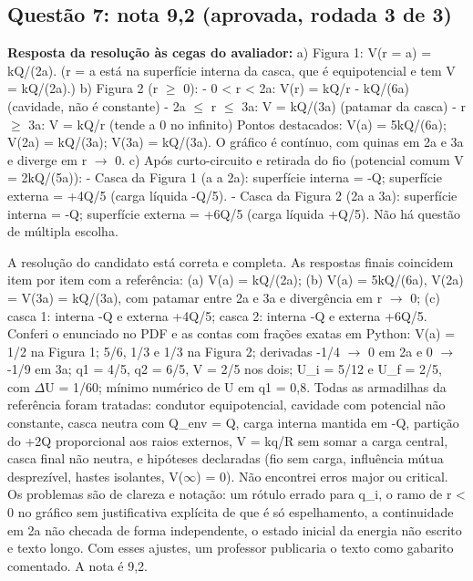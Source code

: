 \documentclass{article}%
\begin{document}
\subsection*{Questão 7: nota 9,2 (aprovada, rodada 3 de 3)}%
\textbf{Resposta da resolução às cegas do avaliador:} a) Figura 1: V(r = a) = kQ/(2a). (r = a está na superfície interna da casca, que é equipotencial e tem V = kQ/(2a).)\newline%
\newline%
b) Figura 2 (r $\geq$ 0):\newline%
{-} 0 < r < 2a: V(r) = kQ/r - kQ/(6a) (cavidade, não é constante)\newline%
{-} 2a $\leq$ r $\leq$ 3a: V = kQ/(3a) (patamar da casca)\newline%
{-} r $\geq$ 3a: V = kQ/r (tende a 0 no infinito)\newline%
Pontos destacados: V(a) = 5kQ/(6a); V(2a) = kQ/(3a); V(3a) = kQ/(3a). O gráfico é contínuo, com quinas em 2a e 3a e diverge em r $\to$ 0.\newline%
\newline%
c) Após curto{-}circuito e retirada do fio (potencial comum V = 2kQ/(5a)):\newline%
{-} Casca da Figura 1 (a a 2a): superfície interna = -Q; superfície externa = +4Q/5 (carga líquida -Q/5).\newline%
{-} Casca da Figura 2 (2a a 3a): superfície interna = -Q; superfície externa = +6Q/5 (carga líquida +Q/5).\newline%
Não há questão de múltipla escolha.\par %
A resolução do candidato está correta e completa. As respostas finais coincidem item por item com a referência: (a) V(a) = kQ/(2a); (b) V(a) = 5kQ/(6a), V(2a) = V(3a) = kQ/(3a), com patamar entre 2a e 3a e divergência em r $\to$ 0; (c) casca 1: interna -Q e externa +4Q/5; casca 2: interna -Q e externa +6Q/5. Conferi o enunciado no PDF e as contas com frações exatas em Python: V(a) = 1/2 na Figura 1; 5/6, 1/3 e 1/3 na Figura 2; derivadas -1/4 $\to$ 0 em 2a e 0 $\to$ -1/9 em 3a; q1 = 4/5, q2 = 6/5, V = 2/5 nos dois; U\_i = 5/12 e U\_f = 2/5, com $\Delta$U = 1/60; mínimo numérico de U em q1 = 0,8. Todas as armadilhas da referência foram tratadas: condutor equipotencial, cavidade com potencial não constante, casca neutra com Q\_env = Q, carga interna mantida em -Q, partição do +2Q proporcional aos raios externos, V = kq/R sem somar a carga central, casca final não neutra, e hipóteses declaradas (fio sem carga, influência mútua desprezível, hastes isolantes, V($\infty$) = 0). Não encontrei erros major ou critical. Os problemas são de clareza e notação: um rótulo errado para q\_i, o ramo de r < 0 no gráfico sem justificativa explícita de que é só espelhamento, a continuidade em 2a não checada de forma independente, o estado inicial da energia não escrito e texto longo. Com esses ajustes, um professor publicaria o texto como gabarito comentado. A nota é 9,2.%
\end{document}

